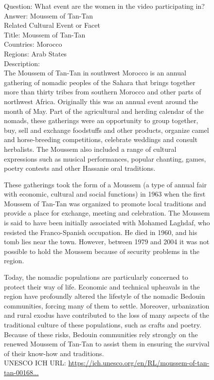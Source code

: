 \begin{figure}[H]
\begin{tcolorbox}[colback=gray!5!white,colframe=black!75!black,fonttitle=\bfseries\scriptsize,fontupper=\ttfamily\footnotesize,segmentation style={solid, black!30}]
  {\Large{Question:}} {\large{What event are the women in the video participating in?}}\\
  {\Large{Answer:}} {\large{Moussem of Tan-Tan}}\\
   \tcbline
  {\Large{Related Cultural Event or Facet}}\\[4mm]
  {\normalsize{Title:}} {\normalsize{Moussem of Tan-Tan}}\\
  {\normalsize{Countries:}} Morocco\\
  {\normalsize{Regions:}} Arab States\\
  {\normalsize{Description:}}\\
  The Moussem of Tan-Tan in southwest Morocco is an annual gathering of nomadic peoples of the Sahara that brings together more than thirty tribes from southern Morocco and other parts of northwest Africa. Originally this was an annual event around the month of May. Part of the agricultural and herding calendar of the nomads, these gatherings were an opportunity to group together, buy, sell and exchange foodstuffs and other products, organize camel and horse-breeding competitions, celebrate weddings and consult herbalists. The Moussem also included a range of cultural expressions such as musical performances, popular chanting, games, poetry contests and other Hassanie oral traditions. 

These gatherings took the form of a Moussem (a type of annual fair with economic, cultural and social functions) in 1963 when the first Moussem of Tan-Tan was organized to promote local traditions and provide a place for exchange, meeting and celebration. The Moussem is said to have been initially associated with Mohamed Laghdaf, who resisted the Franco-Spanish occupation. He died in 1960, and his tomb lies near the town. However, between 1979 and 2004 it was not possible to hold the Moussem because of security problems in the region. 

Today, the nomadic populations are particularly concerned to protect their way of life. Economic and technical upheavals in the region have profoundly altered the lifestyle of the nomadic Bedouin communities, forcing many of them to settle. Moreover, urbanization and rural exodus have contributed to the loss of many aspects of the traditional culture of these populations, such as crafts and poetry. Because of these risks, Bedouin communities rely strongly on the renewed Moussem of Tan-Tan to assist them in ensuring the survival of their know-how and traditions.\\[2mm]
  {\normalsize{UNESCO ICH URL:}} \href{https://ich.unesco.org/en/RL/moussem-of-tan-tan-00168}{https://ich.unesco.org/en/RL/moussem-of-tan-tan-00168...}
\end{tcolorbox}
\end{figure}